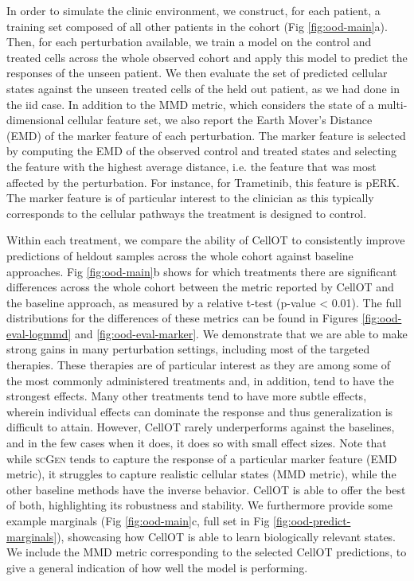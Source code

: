 In order to simulate the clinic environment, we construct, for each patient, a training set composed of all other patients in the cohort (Fig \ref{fig:ood-main}a).
Then, for each perturbation available,
we train a model on the control and treated cells across the whole observed cohort
and apply this model to predict the responses of the unseen patient.
We then evaluate the set of predicted cellular states against the unseen treated cells of the held out patient, as we had done in the iid case.
In addition to the MMD metric, which considers the state of a multi-dimensional cellular feature set,
we also report the Earth Mover’s Distance (EMD) of the marker feature of each perturbation.
The marker feature is selected by computing the EMD of the observed control and treated states and selecting the feature with the highest average distance,
i.e. the feature that was most affected by the perturbation.
For instance, for Trametinib, this feature is pERK.
The marker feature is of particular interest to the clinician as this typically corresponds to the cellular pathways the treatment is designed to control.

Within each treatment, we compare the ability of CellOT to consistently improve predictions of heldout samples across the whole cohort against baseline approaches.
Fig \ref{fig:ood-main}b shows for which treatments there are significant differences across the whole cohort between
the metric reported by CellOT and the baseline approach, as measured by a relative t-test (p-value < 0.01).
The full distributions for the differences of these metrics can be found in Figures \ref{fig:ood-eval-logmmd} and \ref{fig:ood-eval-marker}.
We demonstrate that we are able to make strong gains in many perturbation settings, including most of the targeted therapies.
These therapies are of particular interest as they are among some of the most commonly administered treatments \cite{need} and, in addition, tend to have the strongest effects.
Many other treatments tend to have more subtle effects, wherein individual effects can dominate the response and thus generalization is difficult to attain.
However, CellOT rarely underperforms against the baselines, and in the few cases when it does, it does so with small effect sizes.
Note that while \textsc{scGen} tends to capture the response of a particular marker feature (EMD metric), it struggles to capture realistic cellular states (MMD metric), while the other baseline methods have the inverse behavior.
CellOT is able to offer the best of both, highlighting its robustness and stability.
We furthermore provide some example marginals (Fig \ref{fig:ood-main}c, full set in Fig \ref{fig:ood-predict-marginals}), showcasing how CellOT is able to learn biologically relevant states.
We include the MMD metric corresponding to the selected CellOT predictions, to give a general indication of how well the model is performing.

